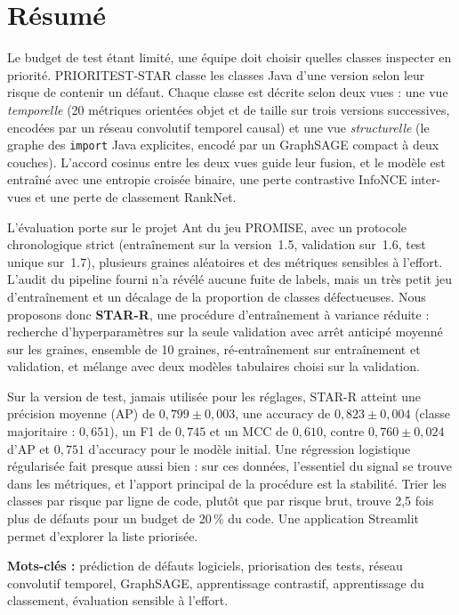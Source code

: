 \documentclass[11pt,a4paper,openany]{report}
\newcommand{\code}[1]{\texttt{\small #1}}
\begin{document}
\chapter*{Résumé}
Le budget de test étant limité, une équipe doit choisir quelles classes inspecter en priorité.
PRIORITEST-STAR classe les classes Java d'une version selon leur risque de contenir un défaut.
Chaque classe est décrite selon deux vues : une vue \emph{temporelle} (20 métriques orientées objet et de taille
sur trois versions successives, encodées par un réseau convolutif temporel causal) et une vue \emph{structurelle}
(le graphe des \code{import} Java explicites, encodé par un GraphSAGE compact à deux couches).
L'accord cosinus entre les deux vues guide leur fusion, et le modèle est entraîné avec une entropie croisée binaire,
une perte contrastive InfoNCE inter-vues et une perte de classement RankNet.

L'évaluation porte sur le projet Ant du jeu PROMISE, avec un protocole chronologique strict (entraînement sur la
version~1.5, validation sur~1.6, test unique sur~1.7), plusieurs graines aléatoires et des métriques sensibles à
l'effort. L'audit du pipeline fourni n'a révélé aucune fuite de labels, mais un très petit jeu d'entraînement et un
décalage de la proportion de classes défectueuses. Nous proposons donc \textbf{STAR-R}, une procédure d'entraînement
à variance réduite : recherche d'hyperparamètres sur la seule validation avec arrêt anticipé moyenné sur les graines,
ensemble de 10 graines, ré-entraînement sur entraînement et validation, et mélange avec deux modèles tabulaires
choisi sur la validation.

Sur la version de test, jamais utilisée pour les réglages, STAR-R atteint une précision moyenne (AP) de
$0{,}799\pm0{,}003$, une accuracy de $0{,}823\pm0{,}004$ (classe majoritaire : $0{,}651$), un F1 de $0{,}745$ et un
MCC de $0{,}610$, contre $0{,}760\pm0{,}024$ d'AP et $0{,}751$ d'accuracy pour le modèle initial. Une régression
logistique régularisée fait presque aussi bien : sur ces données, l'essentiel du signal se trouve dans les métriques,
et l'apport principal de la procédure est la stabilité. Trier les classes par risque par ligne de code, plutôt que
par risque brut, trouve 2,5 fois plus de défauts pour un budget de 20\,\% du code. Une application Streamlit permet
d'explorer la liste priorisée.

\medskip\noindent\textbf{Mots-clés :} prédiction de défauts logiciels, priorisation des tests, réseau convolutif
temporel, GraphSAGE, apprentissage contrastif, apprentissage du classement, évaluation sensible à l'effort.
\end{document}
